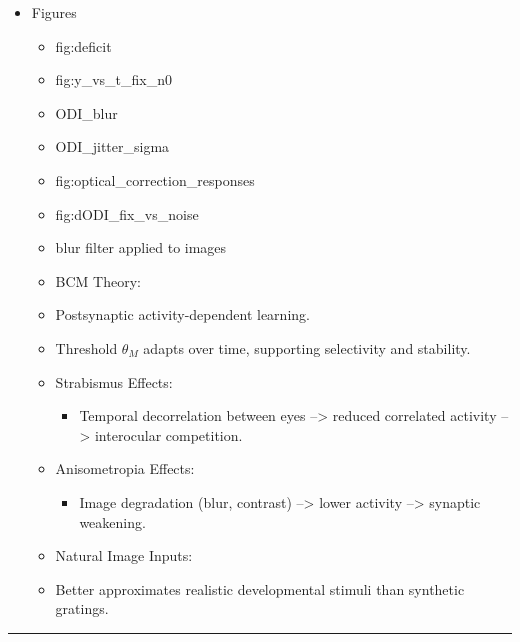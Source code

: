 \documentclass[
]{article}
\providecommand{\tightlist}{%
  \setlength{\itemsep}{0pt}\setlength{\parskip}{0pt}}
\begin{document}
\begin{itemize}
\tightlist
\item[$\square$]
  Figures

  \begin{itemize}
  \item[$\boxtimes$]
    fig:deficit
  \item[$\boxtimes$]
    fig:y\_vs\_t\_fix\_n0
  \item[$\boxtimes$]
    ODI\_blur
  \item[$\boxtimes$]
    ODI\_jitter\_sigma
  \item[$\boxtimes$]
    fig:optical\_correction\_responses
  \item[$\boxtimes$]
    fig:dODI\_fix\_vs\_noise
  \item[$\boxtimes$]
    blur filter applied to images
  \item[$\boxtimes$]
    BCM Theory:
  \item[$\boxtimes$]
    Postsynaptic activity-dependent learning.
  \item[$\boxtimes$]
    Threshold \(\theta_M\) adapts over time, supporting selectivity and
    stability.
  \item[$\boxtimes$]
    Strabismus Effects:

    \begin{itemize}
    \tightlist
    \item[$\boxtimes$]
      Temporal decorrelation between eyes --\textgreater{} reduced
      correlated activity --\textgreater{} interocular competition.
    \end{itemize}
  \item[$\boxtimes$]
    Anisometropia Effects:

    \begin{itemize}
    \tightlist
    \item[$\boxtimes$]
      Image degradation (blur, contrast) --\textgreater{} lower activity
      --\textgreater{} synaptic weakening.
    \end{itemize}
  \item[$\boxtimes$]
    Natural Image Inputs:
  \item[$\boxtimes$]
    Better approximates realistic developmental stimuli than synthetic
    gratings.
  \end{itemize}
\end{itemize}

\begin{center}\rule{0.5\linewidth}{0.5pt}\end{center}
\end{document}

